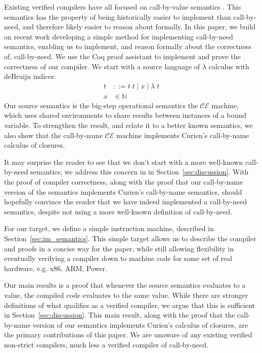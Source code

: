 Existing verified compilers have all focused on call-by-value semantics
\cite{chlipala, compcert, cakeml}. This semantics has the property of being
historically easier to implement than call-by-need, and therefore likely easier
to reason about formally. In this paper, we build on recent work developing a
simple method for implementing call-by-need semantics, enabling us to implement,
and reason formally about the correctness of, call-by-need. We use the Coq proof
assistant \cite{coq} to implement and prove the correctness of our compiler. We
start with a source language of $\lambda$ calculus with deBruijn indices:
\begin{align*}
 t &::= t \; t \; | \; x \; | \;  \lambda \; t \\
 x &\in \mathbb{N}
\end{align*}
Our source semantics is the big-step operational semantics the $\mathcal{CE}$
machine, which uses shared environments to share results between instances of a
bound variable. To strengthen the result, and relate it to a better known
semantics, we also show that the call-by-name $\mathcal{CE}$ machine implements
Curien's call-by-name calculus of closures. 

It may surprise the reader to see that we don't start with a more well-known
call-by-need semantics; we address this concern in in
Section~\ref{sec:discussion}.  With the proof of compiler correctness, along
with the proof that our call-by-name version of the semantics implements
Curien's call-by-name semantics, should hopefully convince the reader that we
have indeed implemented a call-by-need semantics, despite not using a more
well-known definition of call-by-need. 

For our target, we define a simple instruction machine, described in
Section~\ref{sec:im_semantics}. This simple target allows us to describe the
compiler and proofs in a concise way for the paper, while still allowing
flexibility in eventually verifying a compiler down to machine code for some
set of real hardware, e.g. x86, ARM, Power. 

Our main results is a proof that whenever the source semantics evaluates to a
value, the compiled code evaluates to the same value. While there are stronger
definitions of what qualifies as a verified compiler, we argue that this is
sufficient in Section~\ref{sec:discussion}. This main result, along with the
proof that the call-by-name version of our semantics implements Curien's
calculus of closures, are the primary contributions of this paper. We are
unaware of any existing verified non-strict compilers, much less a verified
compiler of call-by-need. 

